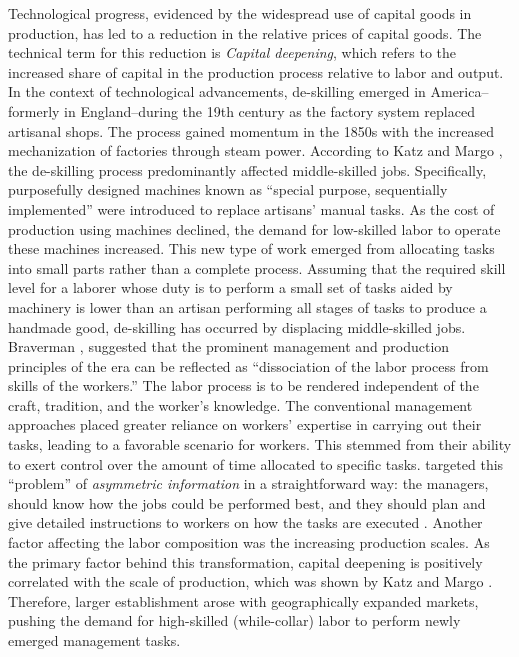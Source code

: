 \begin{onehalfspace}
Technological progress, evidenced by the widespread use of capital
goods in production, has led to a reduction in the relative prices
of capital goods. The technical term for this reduction\emph{ }is\emph{
Capital deepening}, which refers to the increased share of capital
in the production process relative to labor and output. In the context
of technological advancements, de-skilling emerged in America--formerly
in England--during the 19th century as the factory system replaced
artisanal shops. The process gained momentum in the 1850s with the
increased mechanization of factories through steam power. According
to Katz and Margo \citeyearpar{Katz2013}, the de-skilling process
predominantly affected middle-skilled jobs. Specifically, purposefully
designed machines known as ``special purpose, sequentially
implemented'' were introduced to replace artisans' manual
tasks. As the cost of production using machines declined, the demand
for low-skilled labor to operate these machines increased. This new
type of work emerged from allocating tasks into small parts rather
than a complete process. Assuming that the required skill level for
a laborer whose duty is to perform a small set of tasks aided by machinery
is lower than an artisan performing all stages of tasks to produce
a handmade good, de-skilling has occurred by displacing middle-skilled
jobs. Braverman \citeyearpar{Braverman1974}, suggested that the prominent
management and production principles of the era can be reflected as
``dissociation of the labor process from skills of the workers.'' The
labor process is to be rendered independent of the craft, tradition,
and the worker's knowledge. The conventional management approaches
placed greater reliance on workers' expertise in carrying out their
tasks, leading to a favorable scenario for workers. This stemmed from
their ability to exert control over the amount of time allocated to
specific tasks. \citet{taylor} targeted this ``problem'' of \emph{asymmetric
information }in a straightforward way: the managers, should know how
the jobs could be performed best, and they should plan and give detailed
instructions to workers on how the tasks are executed \citealt{2014Pagano}.
Another factor affecting the labor composition was the increasing
production scales. As the primary factor behind this transformation,
capital deepening is positively correlated with the scale of production,
which was shown by Katz and Margo \citeyearpar{Katz2013}. Therefore,
larger establishment arose with geographically expanded markets, pushing
the demand for high-skilled (while-collar) labor to perform newly
emerged management tasks.


\end{onehalfspace}
